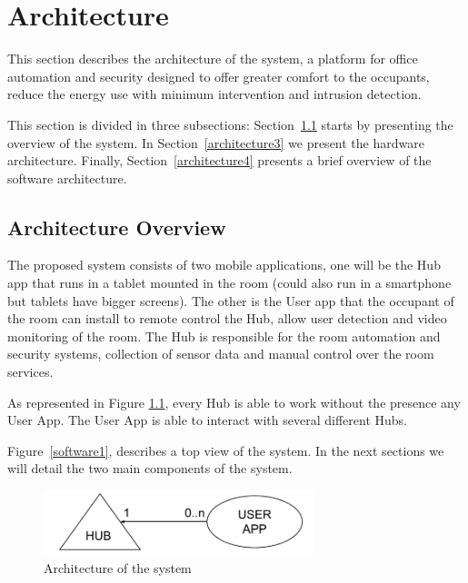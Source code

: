 \chapter{Architecture}
\label{chapter:architecture}

This section describes the architecture of the system, a platform for office automation and security designed to offer greater comfort to the occupants, reduce the energy use with minimum intervention and intrusion detection.

This section is divided in three subsections: Section~\ref{architecture2} starts by presenting the overview of the system. In Section~\ref{architecture3} we present the hardware architecture. Finally, Section~\ref{architecture4} presents a brief overview of the software architecture.


\section{Architecture Overview}\label{architecture2} 


The proposed system consists of two mobile applications, one will be the Hub app that runs in a tablet mounted in the room (could also run in a smartphone but tablets have bigger screens). The other is the User app that the occupant of the room can install to remote control the Hub, allow user detection and video monitoring of the room. The Hub is responsible for the room automation and security systems, collection of sensor data and manual control over the room services.


As represented in Figure \ref{architecture_system}, every Hub is able to work without the presence any User App. The User App is able to interact with several different Hubs.

Figure~\ref{software1}, describes a top view of the system. In the next sections we will detail the two main components of the system.

\begin{figure}[h]
\centering
\includegraphics[width=0.7\textwidth]{Figures/system_architecture}
\caption{Architecture of the system}
\label{architecture_system}
\end{figure}

